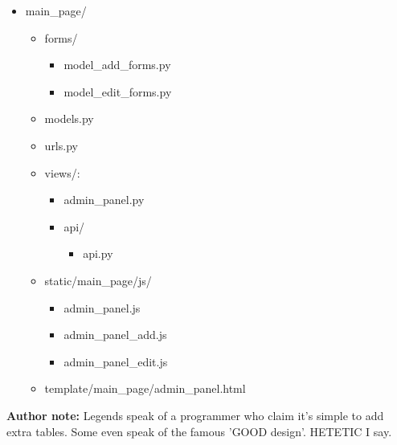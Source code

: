 \documentclass{article}
\begin{document}
\begin{itemize}
	\item[] main\_page/
	\begin{itemize}
		\item[] forms/
		\begin{itemize}
			\item model_add_forms.py
			\item model_edit_forms.py
		\end{itemize}	
		\item models.py
		\item urls.py
		\item[] views/:
		\begin{itemize}
			\item admin\_panel.py
			\item[] api/
			\begin{itemize}
				\item api.py
			\end{itemize}
		\end{itemize}
		\item[] static/main\_page/js/
		\begin{itemize}
			\item admin\_panel.js
			\item admin\_panel\_add.js
			\item admin\_panel\_edit.js
		\end{itemize}
		\item[] template/main\_page/admin_panel.html
	\end{itemize}
	
\end{itemize}
\textbf{Author note:} Legends speak of a programmer who claim it's simple to add extra tables. Some even speak of the famous 'GOOD design'. HETETIC I say.
\end{document}
